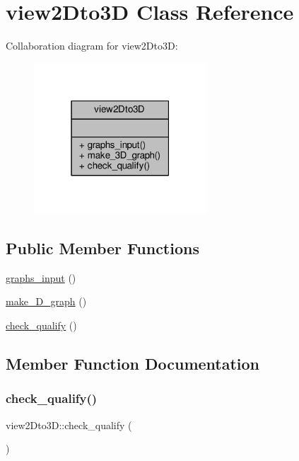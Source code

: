 \hypertarget{classview2Dto3D}{}\section{view2\+Dto3D Class Reference}
\label{classview2Dto3D}


Collaboration diagram for view2\+Dto3D\+:
\nopagebreak
\begin{figure}[H]
\begin{center}
\leavevmode
\includegraphics[width=183pt]{classview2Dto3D__coll__graph}
\end{center}
\end{figure}
\subsection*{Public Member Functions}
\begin{DoxyCompactItemize}
\item 
\hyperlink{classview2Dto3D_aeaf8d04a7b6dee4c61a791ddae2d4add}{graphs\+\_\+input} ()
\item 
\hyperlink{classview2Dto3D_a9bb5691d1dae21c9f0fe2573c04db1da}{make\+\_\+D\+\_\+graph} ()
\item 
\hyperlink{classview2Dto3D_a502d119bc3cb39c9c43ce6663e420ce5}{check\+\_\+qualify} ()
\end{DoxyCompactItemize}


\subsection{Member Function Documentation}
\mbox{\label{classview2Dto3D_a502d119bc3cb39c9c43ce6663e420ce5}} 
\subsubsection{\texorpdfstring{check\+\_\+qualify()}{check\_qualify()}}
{\footnotesize\ttfamily view2\+Dto3\+D\+::check\+\_\+qualify (\begin{DoxyParamCaption}{ }\end{DoxyParamCaption})\hspace{0.3cm}{\ttfamily [inline]}}

